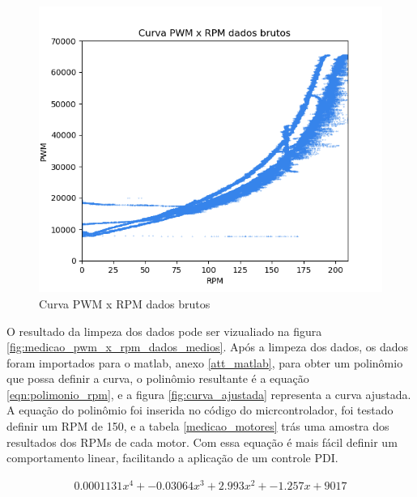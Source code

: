 \begin{figure}[htb]
	\centering
	\includegraphics{figures/curva_pwm_x_rpm_dados_brutos}
	\caption{Curva PWM x RPM dados brutos}
	\label{fig:medicao_pwm_x_rpm_dados_brutos}
\end{figure}


O resultado da limpeza dos dados pode ser vizualiado na figura \ref{fig:medicao_pwm_x_rpm_dados_medios}.
Após a limpeza dos dados, os dados foram importados para o matlab, anexo \ref{att_matlab},
para obter um polinômio que possa definir a curva, o polinômio resultante é a equação \ref{eqn:polimonio_rpm}, e a figura \ref{fig:curva_ajustada} representa a curva ajustada.
A equação do polinômio foi inserida no código do micrcontrolador, foi testado definir um RPM de 150, e a tabela \ref{medicao_motores} trás uma amostra dos resultados dos RPMs de cada motor.
Com essa equação é mais fácil definir um comportamento linear, facilitando a aplicação de um controle PDI.

\begin{equation}
    \begin{split}
        0.0001131x^{4} + -0.03064x^{3} + 2.993x^{2} + -1.257x + 9017
    \end{split}
    \label{eqn:polimonio_rpm}
\end{equation}

